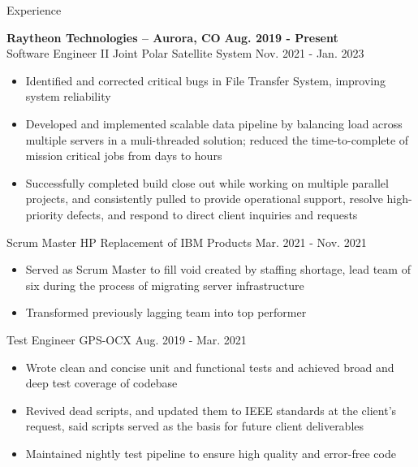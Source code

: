 \documentclass[8pt]{resumeclass}
\begin{document}
\resumesect
    {Experience}
    {\textbf{\large{Raytheon Technologies -- Aurora, CO}} \hfill \textbf{Aug. 2019 - Present}
    \vspace{3pt}\\
    \experiencesect
	{Software Engineer II}
	{Joint Polar Satellite System}
	{Nov. 2021 - Jan. 2023}
	{\begin{itemize}[noitemsep,nolistsep]
	    \item Identified and corrected critical bugs in File Transfer
	    System, improving system reliability 
	    \item Developed and implemented scalable data pipeline by balancing
	    load across multiple servers in a muli-threaded solution; reduced
	    the time-to-complete of mission critical jobs from days to hours
	    \item Successfully completed build close out while working on
	    multiple parallel projects, and consistently pulled to provide
	    operational support, resolve high-priority defects, and respond to
	    direct client inquiries and requests
	\end{itemize}}
    \vspace{3pt}
    \experiencesect
	{Scrum Master}
	{HP Replacement of IBM Products}
	{Mar. 2021 - Nov. 2021}
	{\begin{itemize}[noitemsep,nolistsep]
	    \item Served as Scrum Master to fill void created by staffing
	    shortage, lead team of six during the process of migrating server
	    infrastructure
	    \item Transformed previously lagging team into top performer
	\end{itemize}}
    \vspace{3pt}
    \experiencesect
	{Test Engineer}
	{GPS-OCX}
	{Aug. 2019 - Mar. 2021}
	{\begin{itemize}[noitemsep,nolistsep]
	    \item Wrote clean and concise unit and functional tests and achieved
	    broad and deep test coverage of codebase
	    \item Revived dead scripts, and updated them to IEEE standards at
	    the client's request, said scripts served as the basis for future
	    client deliverables
	    \item Maintained nightly test pipeline to ensure high quality and
	    error-free code
	\end{itemize}}}
\end{document}
